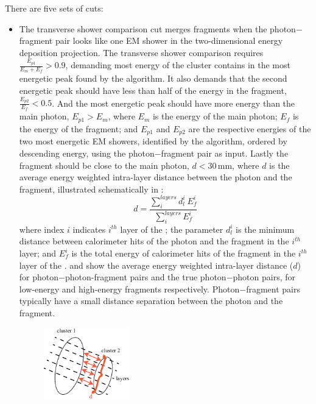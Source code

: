 There are five sets of cuts:
\begin{itemize}
  \item The transverse shower comparison cut merges fragments when the photon$-$fragment pair looks like one EM shower in the two-dimensional energy deposition projection. The transverse shower comparison requires $\frac{E_{p1}}{E_m + E_f} > 0.9 $, demanding  most energy of the cluster contains in the most energetic peak found by the  \peakFinding algorithm. It also demands that the second energetic peak should have less than half of the energy in the fragment,  $\frac{E_{p2}}{E_f} < 0.5 $. And the most energetic peak should have more energy than the main photon,   $E_{p1} > E_m$, where $E_m$ is the energy of the main photon;  $E_f$ is  the energy of the fragment; and $E_{p1}$ and $E_{p2}$ are the respective energies of the two most energetic EM showers,  identified by the \peakFinding algorithm, ordered by descending energy, using the photon$-$fragment pair as input. Lastly the fragment should be close to the main photon, $d < 30 $\,mm, where $d$ is the average energy weighted intra-layer distance between the photon and the fragment, illustrated schematically in :
\begin{equation}
d = \frac{\sum_{i}^{layers}d_l^i \ E_{f}^i}{\sum_{i}^{layers}E_{f}^i}
\end{equation}
where index $i$ indicates $i^{th}$ layer of the \ECAL; the parameter $d_{l}^i$ is the minimum distance between calorimeter hits of the photon and the fragment in the $i^{th}$ layer; and $E_{f}^i$ is the total energy of calorimeter hits of the fragment in the $i^{th}$ layer of the \ECAL.    and  show the average energy weighted intra-layer distance ($d$) for  photon$-$photon-fragment pairs and the true photon$-$photon pairs, for low-energy and high-energy fragments respectively. Photon$-$fragment pairs typically have a small distance separation between the photon and the fragment.
\begin{figure}[tbph]
\centering
\includegraphics[width=0.35\textwidth]{photon/dLayer3}

\end{figure}
\end{itemize}
